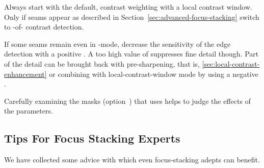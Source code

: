 Always start with the default, contrast weighting with a local
contrast window.  Only if seams appear as described in
Section~\ref{sec:advanced-focus-stacking} switch to
-of- contrast detection.

If some seams remain even in -mode, decrease the
sensitivity of the edge detection with a positive
.  A too high value of
 suppresses fine detail though.  Part
of the detail can be brought back with pre-sharpening, that is,
\ref{sec:local-contrast-enhancement} or combining  with
local-contrast-window mode by using a negative
.

Carefully examining the masks (option~) that
\App{} uses helps to judge the effects of the parameters.


\subsection[Tips For Focus Stacking Experts]{Tips For Focus Stacking Experts
  \label{sec:tips-for-focus-stacking-experts}
  }

We have collected some advice with which even focus-stacking adepts
can benefit.

